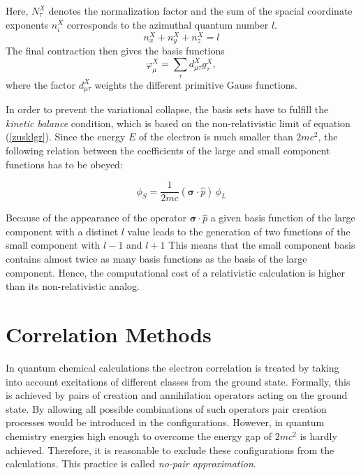 Here, $N_\tau^X$ denotes the normalization factor and the sum of the spacial
coordinate exponents $n_i^X$ corresponds to the azimuthal quantum number $l$.
\begin{equation}
n_x^X+n_y^X+n_z^X=l
\end{equation}
The final contraction then gives the basis functions
\begin{equation}
\varphi^X_\mu = \sum\limits_\tau d_{\mu\tau}^Xg_\tau^X,
\end{equation}
where the factor $d_{\mu\tau}^X$ weights the different primitive Gauss functions.

In order to prevent the variational collapse, the basis sets have to fulfill
the \emph{kinetic balance} condition, which is based on the non-relativistic limit of
equation (\ref{zusklgr}). Since the energy $E$ of the electron is much smaller than
$2mc^2$, the following relation between the coefficients
of the large and small component functions has to be obeyed:

\begin{equation}\label{kinbal}
\phi_S = \frac1{2mc}(\boldsymbol{\sigma}\cdot\hat{p})\,\phi_L
\end{equation}


Because of the appearance of the operator $\boldsymbol{\sigma}\cdot\hat{p}$
a given basis function of the large component with a distinct $l$ value
leads to the generation of two functions of the small component
with $l-1$ and $l+1$
This means that the small component basis
contains almost twice as many basis functions as the basis of the large component.
Hence, the computational cost of a relativistic calculation is higher than its
non-relativistic analog.


\section{Correlation Methods}
In quantum chemical calculations the electron correlation is treated by taking into
account excitations of different classes from the ground state. Formally, this is
achieved by pairs of creation and annihilation operators acting on the ground
state. By allowing all possible combinations of such operators pair creation
processes would be introduced in the configurations. However, in quantum chemistry
energies high enough to overcome the energy gap of $2mc^2$ is hardly achieved.
Therefore, it is reasonable to exclude these configurations from the calculations.
This practice is called \emph{no-pair approximation}.





